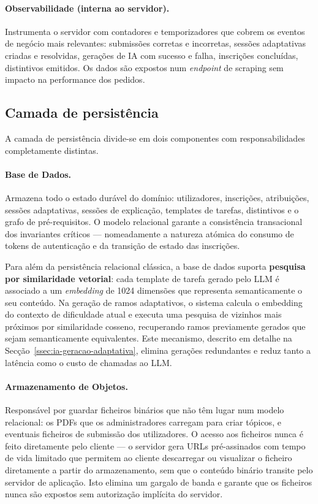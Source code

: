 \paragraph{Observabilidade (interna ao servidor).}
Instrumenta o servidor com contadores e temporizadores que cobrem os eventos
de neg\'ocio mais relevantes: submiss\~oes corretas e incorretas, sess\~oes
adaptativas criadas e resolvidas, gera\c{c}\~oes de IA com sucesso e falha,
inscri\c{c}\~oes conclu\'idas, distintivos emitidos. Os dados s\~ao expostos
num \emph{endpoint} de scraping sem impacto na performance dos pedidos.

\subsection{Camada de persist\^encia}
\label{ssec:persistencia}

A camada de persist\^encia divide-se em dois componentes com responsabilidades
completamente distintas.

\paragraph{Base de Dados.}
Armazena todo o estado dur\'avel do dom\'inio: utilizadores, inscri\c{c}\~oes,
atribui\c{c}\~oes, sess\~oes adaptativas, sess\~oes de explica\c{c}\~ao,
templates de tarefas, distintivos e o grafo de pr\'e-requisitos. O modelo
relacional garante a consist\^encia transacional dos invariantes cr\'iticos
--- nomeadamente a natureza at\'omica do consumo de tokens de
autentica\c{c}\~ao e da transi\c{c}\~ao de estado das inscri\c{c}\~oes.

Para al\'em da persist\^encia relacional cl\'assica, a base de dados suporta
\textbf{pesquisa por similaridade vetorial}: cada template de tarefa gerado
pelo LLM \'e associado a um \emph{embedding} de 1024 dimens\~oes que
representa semanticamente o seu conte\'udo. Na gera\c{c}\~ao de ramos
adaptativos, o sistema calcula o embedding do contexto de dificuldade atual
e executa uma pesquisa de vizinhos mais pr\'oximos por similaridade cosseno,
recuperando ramos previamente gerados que sejam semanticamente equivalentes.
Este mecanismo, descrito em detalhe na Sec\c{c}\~ao~\ref{ssec:ia-geracao-adaptativa},
elimina gera\c{c}\~oes redundantes e reduz tanto a lat\^encia como o custo
de chamadas ao LLM.

\paragraph{Armazenamento de Objetos.}
Respons\'avel por guardar ficheiros bin\'arios que n\~ao t\^em lugar num
modelo relacional: os PDFs que os administradores carregam para criar
t\'opicos, e eventuais ficheiros de submiss\~ao dos utilizadores. O acesso
aos ficheiros nunca \'e feito diretamente pelo cliente --- o servidor gera
URLs pr\'e-assinados com tempo de vida limitado que permitem ao cliente
descarregar ou visualizar o ficheiro diretamente a partir do armazenamento,
sem que o conte\'udo bin\'ario transite pelo servidor de aplica\c{c}\~ao.
Isto elimina um gargalo de banda e garante que os ficheiros nunca s\~ao
expostos sem autoriza\c{c}\~ao impl\'icita do servidor.

